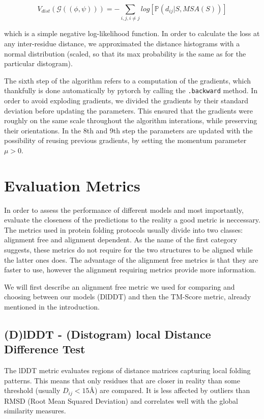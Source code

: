 \begin{equation}
     V_{dist}(\mathcal{G}((\phi, \psi))) = -\sum_{i, j, i \neq j} log[\mathds{P} (d_{ij} | S, MSA(S))]
     \label{eq:dist_pot}
\end{equation}

which is a simple negative log-likelihood function. In order to calculate the loss at any inter-residue distance, we approximated the distance histograms with a normal distribution (scaled, so that its max probability is the same as for the particular distogram).

The sixth step of the algorithm refers to a computation of the gradients, which thankfully is done automatically by pytorch by calling the \texttt{.backward} method. In order to avoid exploding gradients, we divided the gradients by their standard deviation before updating the parameters. This ensured that the gradients were roughly on the same scale throughout the algorithm interations, while preserving their orientations. In the 8th and 9th step the parameters are updated with the possibility of reusing previous gradients, by setting the momentum parameter $\mu > 0$.

\section{Evaluation Metrics}

In order to assess the performance of different models and most importantly, evaluate the closeness of the predictions to the reality a good metric is neccessary. The metrics used in protein folding protocols usually divide into two classes: alignment free and alignment dependent. As the name of the first category suggests, these metrics do not require for the two structures to be aligned while the latter ones does. The advantage of the alignment free metrics is that they are faster to use, however the alignment requiring metrics provide more information. 

We will first describe an alignment free metric we used for comparing and choosing between our models (DlDDT) and then the TM-Score metric, already mentioned in the introduction.

\subsection{(D)lDDT - (Distogram) local Distance Difference Test}

The lDDT metric evaluates regions of distance matrices capturing local folding patterns. This means that only residues that are closer in reality than some threshold (usually $D_{ij} < 15$\AA) are compared. It is less affected by outliers than RMSD (Root Mean Squared Deviation) and correlates well with the global similarity measures.

